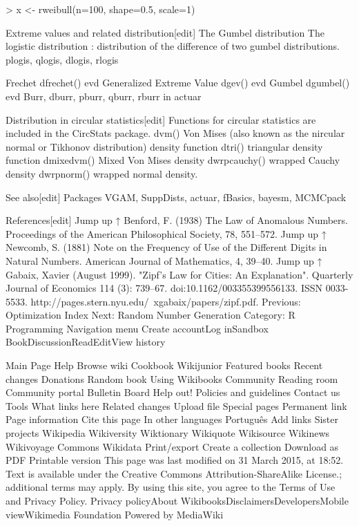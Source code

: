 \documentclass[12pt, a4paper]{article}
\theoremstyle{plain}
\theoremstyle{definition}
\theoremstyle{remark}
\begin{document}
> x <- rweibull(n=100, shape=0.5, scale=1)


Extreme values and related distribution[edit]
The Gumbel distribution
The logistic distribution : distribution of the difference of two gumbel distributions.
plogis, qlogis, dlogis, rlogis

Frechet dfrechet() evd
Generalized Extreme Value dgev() evd
Gumbel dgumbel() evd
Burr, dburr, pburr, qburr, rburr in actuar


Distribution in circular statistics[edit]
Functions for circular statistics are included in the CircStats package.
dvm() Von Mises (also known as the nircular normal or Tikhonov distribution) density function
dtri() triangular density function
dmixedvm() Mixed Von Mises density
dwrpcauchy() wrapped Cauchy density
dwrpnorm() wrapped normal density.


See also[edit]
Packages VGAM, SuppDists, actuar, fBasics, bayesm, MCMCpack


References[edit]
Jump up ↑ Benford, F. (1938) The Law of Anomalous Numbers. Proceedings of the American Philosophical Society, 78, 551–572.
Jump up ↑ Newcomb, S. (1881) Note on the Frequency of Use of the Different Digits in Natural Numbers. American Journal of Mathematics, 4, 39–40.
Jump up ↑ Gabaix, Xavier (August 1999). "Zipf's Law for Cities: An Explanation". Quarterly Journal of Economics 114 (3): 739–67. doi:10.1162/003355399556133. ISSN 0033-5533. http://pages.stern.nyu.edu/~xgabaix/papers/zipf.pdf.
Previous: Optimization	Index	Next: Random Number Generation
Category: R Programming
Navigation menu
Create accountLog inSandbox
BookDiscussionReadEditView history

Main Page
Help
Browse wiki
Cookbook
Wikijunior
Featured books
Recent changes
Donations
Random book
Using Wikibooks
Community
Reading room
Community portal
Bulletin Board
Help out!
Policies and guidelines
Contact us
Tools
What links here
Related changes
Upload file
Special pages
Permanent link
Page information
Cite this page
In other languages
Português
Add links
Sister projects
Wikipedia
Wikiversity
Wiktionary
Wikiquote
Wikisource
Wikinews
Wikivoyage
Commons
Wikidata
Print/export
Create a collection
Download as PDF
Printable version
This page was last modified on 31 March 2015, at 18:52.
Text is available under the Creative Commons Attribution-ShareAlike License.; additional terms may apply. By using this site, you agree to the Terms of Use and Privacy Policy.
Privacy policyAbout WikibooksDisclaimersDevelopersMobile viewWikimedia Foundation Powered by MediaWiki
\end{document}
